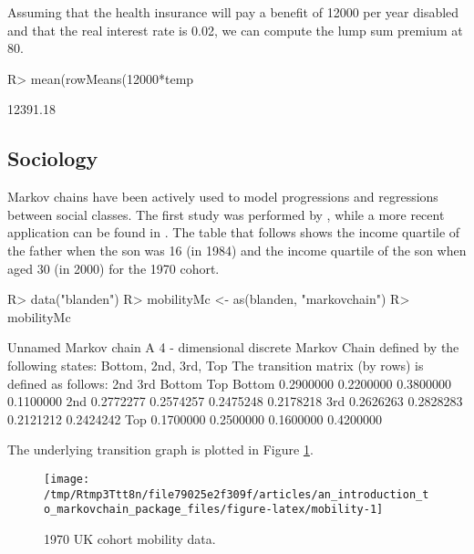 \documentclass[
  nojss]{jss}
\begin{document}
Assuming that the health insurance will pay a benefit of 12000 per year disabled and that the real interest rate is 0.02, we can compute the lump sum premium at 80.

\begin{CodeChunk}

\begin{CodeInput}
R> mean(rowMeans(12000*temp%
\end{CodeInput}

\begin{CodeOutput}
[1] 12391.18
\end{CodeOutput}
\end{CodeChunk}

\hypertarget{app:sociology}{%
\subsection{Sociology}\label{app:sociology}}

Markov chains have been actively used to model progressions and regressions between social classes. The first study was performed by \cite{glassHall}, while a more recent application can be found in \cite{blandenEtAlii}. The table that follows shows the income quartile of the father when the son was 16 (in 1984) and the income quartile of the son when aged 30 (in 2000) for the 1970 cohort.

\begin{CodeChunk}

\begin{CodeInput}
R> data("blanden")
R> mobilityMc <- as(blanden, "markovchain")
R> mobilityMc
\end{CodeInput}

\begin{CodeOutput}
Unnamed Markov chain 
 A  4 - dimensional discrete Markov Chain defined by the following states: 
 Bottom, 2nd, 3rd, Top 
 The transition matrix  (by rows)  is defined as follows: 
             2nd       3rd    Bottom       Top
Bottom 0.2900000 0.2200000 0.3800000 0.1100000
2nd    0.2772277 0.2574257 0.2475248 0.2178218
3rd    0.2626263 0.2828283 0.2121212 0.2424242
Top    0.1700000 0.2500000 0.1600000 0.4200000
\end{CodeOutput}
\end{CodeChunk}

The underlying transition graph is plotted in Figure \ref{fig:mobility}.

\begin{CodeChunk}
\begin{figure}

{\centering \texttt{[image: /tmp/Rtmp3Ttt8n/file79025e2f309f/articles/an\_introduction\_to\_markovchain\_package\_files/figure-latex/mobility-1]} 

}

\caption[1970 UK cohort mobility data]{1970 UK cohort mobility data.}\label{fig:mobility}
\end{figure}
\end{CodeChunk}
\end{document}
